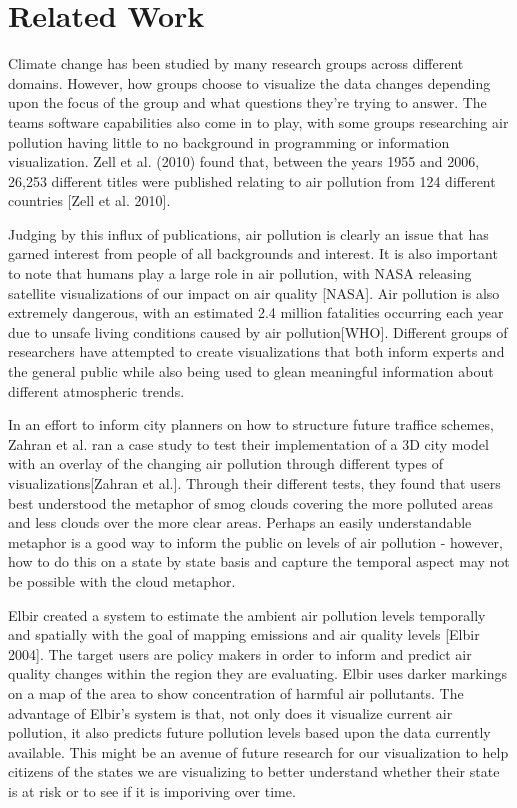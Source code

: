 \documentclass[journal]{vgtc}                %
\begin{document}
\section{Related Work}

Climate change has been studied by many research groups across different domains. However, how groups choose to visualize
the data changes depending upon the focus of the group and what questions they're trying to answer. The teams software
capabilities also come in to play, with some groups researching air pollution having little to no background in 
programming or information visualization. Zell et al. (2010) found that, between the years 1955 and 2006, 
26,253 different titles were published relating to air pollution from 124 different countries [Zell et al. 2010]. 


Judging by this influx of publications, air pollution is clearly an issue that has garned interest from people of all
backgrounds and interest. It is also important to note that humans play a large role in air pollution, with
NASA releasing satellite visualizations of our impact on air quality [NASA]. Air pollution is also extremely dangerous,
with an estimated 2.4 million fatalities occurring each year due to unsafe living conditions caused by air pollution[WHO].
Different groups of researchers have attempted to create visualizations that both inform
experts and the general public while also being used to glean meaningful information about different atmospheric trends.

In an effort to inform city planners on how to structure future traffice schemes, Zahran et al. ran a case study
to test their implementation of a 3D city model with an overlay of the changing air pollution through different types of
visualizations[Zahran et al.]. 
Through their different tests, they found that users best understood the metaphor of smog clouds 
covering the more polluted areas and less clouds over the more clear areas.
Perhaps an easily understandable metaphor is a good way to inform the public on levels of air pollution - however, how
to do this on a state by state basis and capture the temporal aspect may not be possible with the cloud metaphor. 

Elbir created a system to estimate the ambient air pollution levels temporally and spatially with the goal of mapping
emissions and air quality levels [Elbir 2004]. 
The target users are policy makers in order to inform and predict air quality changes within the region they are 
evaluating. Elbir uses darker markings on a map of the area to show concentration of harmful air pollutants.
The advantage of Elbir's system is that, not only does it visualize current air pollution, it also predicts future
pollution levels based upon the data currently available. This might be an avenue of future research for our
visualization to help citizens of the states we are visualizing to better understand whether their state is at risk or
to see if it is imporiving over time. 
\end{document}
